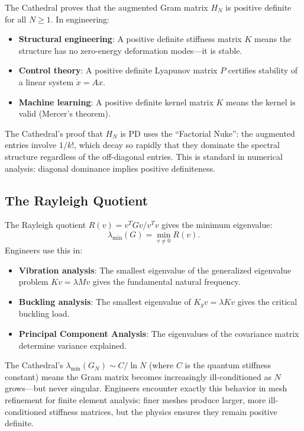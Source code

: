 \documentclass[11pt,a4paper]{article}
\begin{document}
The Cathedral proves that the augmented Gram matrix $H_N$ is
positive definite for all $N \geq 1$. In engineering:

\begin{itemize}
  \item \textbf{Structural engineering}: A positive definite
    stiffness matrix $K$ means the structure has no zero-energy
    deformation modes---it is stable.
  \item \textbf{Control theory}: A positive definite Lyapunov
    matrix $P$ certifies stability of a linear system $\dot{x} = Ax$.
  \item \textbf{Machine learning}: A positive definite kernel matrix
    $K$ means the kernel is valid (Mercer's theorem).
\end{itemize}

The Cathedral's proof that $H_N$ is PD uses the ``Factorial Nuke'':
the augmented entries involve $1/k!$, which decay so rapidly that
they dominate the spectral structure regardless of the off-diagonal
entries. This is standard in numerical analysis: diagonal dominance
implies positive definiteness.

\subsection{The Rayleigh Quotient}

The Rayleigh quotient $R(v) = v^T G v / v^T v$ gives the
minimum eigenvalue:
\[
  \lambda_{\min}(G) = \min_{v \neq 0} R(v).
\]
Engineers use this in:

\begin{itemize}
  \item \textbf{Vibration analysis}: The smallest eigenvalue of the
    generalized eigenvalue problem $Kv = \lambda Mv$ gives the
    fundamental natural frequency.
  \item \textbf{Buckling analysis}: The smallest eigenvalue of
    $K_g v = \lambda K v$ gives the critical buckling load.
  \item \textbf{Principal Component Analysis}: The eigenvalues of
    the covariance matrix determine variance explained.
\end{itemize}

The Cathedral's $\lambda_{\min}(G_N) \sim C / \ln N$ (where $C$ is
the quantum stiffness constant) means the Gram matrix becomes
increasingly ill-conditioned as $N$ grows---but never singular.
Engineers encounter exactly this behavior in mesh refinement for
finite element analysis: finer meshes produce larger, more
ill-conditioned stiffness matrices, but the physics ensures they
remain positive definite.
\end{document}
